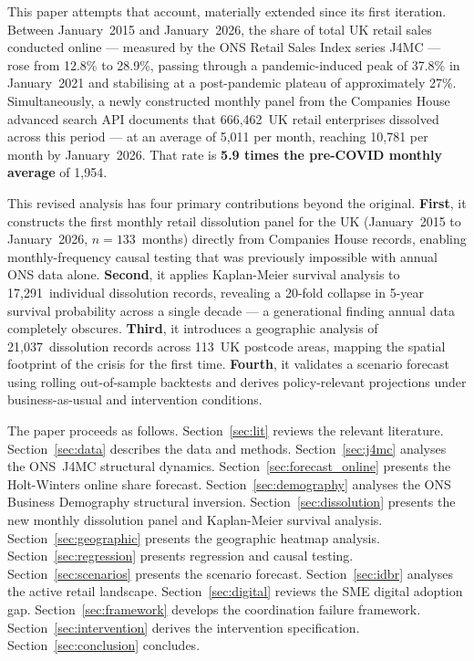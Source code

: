 \documentclass[12pt,a4paper]{article}
\begin{document}
This paper attempts that account, materially extended since its first iteration. Between
January~2015 and January~2026, the share of total UK retail sales conducted online ---
measured by the ONS Retail Sales Index series J4MC \citep{ONS_J4MC} --- rose from
12.8\% to 28.9\%, passing through a pandemic-induced peak of 37.8\% in January~2021
and stabilising at a post-pandemic plateau of approximately 27\%. Simultaneously, a newly
constructed monthly panel from the Companies House advanced search API documents that
666,462~UK retail enterprises dissolved across this period --- at an average of 5,011 per
month, reaching 10,781 per month by January~2026. That rate is \textbf{5.9 times the
pre-COVID monthly average} of 1,954.

This revised analysis has four primary contributions beyond the original. \textbf{First},
it constructs the first monthly retail dissolution panel for the UK (January~2015 to
January~2026, $n=133$~months) directly from Companies House records, enabling
monthly-frequency causal testing that was previously impossible with annual ONS data alone.
\textbf{Second}, it applies Kaplan-Meier survival analysis to 17,291~individual
dissolution records, revealing a 20-fold collapse in 5-year survival probability across a
single decade --- a generational finding annual data completely obscures. \textbf{Third},
it introduces a geographic analysis of 21,037~dissolution records across 113~UK postcode
areas, mapping the spatial footprint of the crisis for the first time. \textbf{Fourth}, it
validates a scenario forecast using rolling out-of-sample backtests and derives
policy-relevant projections under business-as-usual and intervention conditions.

The paper proceeds as follows. Section~\ref{sec:lit} reviews the relevant literature.
Section~\ref{sec:data} describes the data and methods. Section~\ref{sec:j4mc} analyses
the ONS~J4MC structural dynamics. Section~\ref{sec:forecast_online} presents the
Holt-Winters online share forecast. Section~\ref{sec:demography} analyses the ONS
Business Demography structural inversion. Section~\ref{sec:dissolution} presents the new
monthly dissolution panel and Kaplan-Meier survival analysis.
Section~\ref{sec:geographic} presents the geographic heatmap analysis.
Section~\ref{sec:regression} presents regression and causal testing.
Section~\ref{sec:scenarios} presents the scenario forecast.
Section~\ref{sec:idbr} analyses the active retail landscape.
Section~\ref{sec:digital} reviews the SME digital adoption gap.
Section~\ref{sec:framework} develops the coordination failure framework.
Section~\ref{sec:intervention} derives the intervention specification.
Section~\ref{sec:conclusion} concludes.
\end{document}
